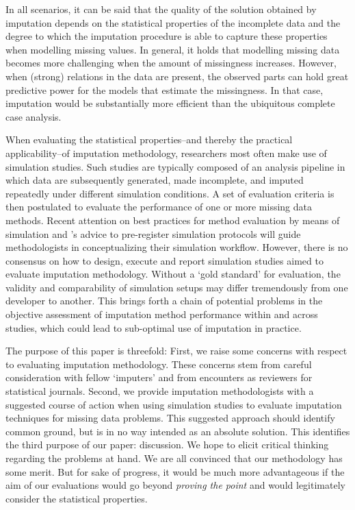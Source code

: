 \documentclass[bimj,fleqn]{w-art}
\begin{document}
In all scenarios, it can be said that the quality of the solution obtained by imputation depends on the statistical properties of the incomplete data and the degree to which the imputation procedure is able to capture these properties when modelling missing values. In general, it holds that modelling missing data becomes more challenging when the amount of missingness increases. However, when (strong) relations in the data are present, the observed parts can hold great predictive power for the models that estimate the missingness. In that case, imputation would be substantially more efficient than the ubiquitous complete case analysis.

When evaluating the statistical properties--and thereby the practical applicability--of imputation methodology, researchers most often make use of simulation studies. Such studies are typically composed of an analysis pipeline in which data are subsequently generated, made incomplete, and imputed repeatedly under different simulation conditions. A set of evaluation criteria is then postulated to evaluate the performance of one or more missing data methods. Recent attention on best practices for method evaluation by means of simulation \citep{morr18} and \citet{pawe22}'s advice to pre-register simulation protocols will guide methodologists in conceptualizing their simulation workflow. However, there is no consensus on how to design, execute and report simulation studies aimed to evaluate imputation methodology. Without a `gold standard' for evaluation, the validity and comparability of simulation setups may differ tremendously from one developer to another. This brings forth a chain of potential problems in the objective assessment of imputation method performance within and across studies, which could lead to sub-optimal use of imputation in practice.


The purpose of this paper is threefold: First, we raise some concerns with respect to evaluating imputation methodology. These concerns stem from careful consideration with fellow `imputers' and from encounters as reviewers for statistical journals. Second, we provide imputation methodologists with a suggested course of action when using simulation studies to evaluate imputation techniques for missing data problems. This suggested approach should identify common ground, but is in no way intended as an absolute solution. This identifies the third purpose of our paper: discussion. We hope to elicit critical thinking regarding the problems at hand. We are all convinced that our methodology has some merit. But for sake of progress, it would be much more advantageous if the aim of our evaluations would go beyond \textit{proving the point} and would legitimately consider the statistical properties. 
\end{document}
